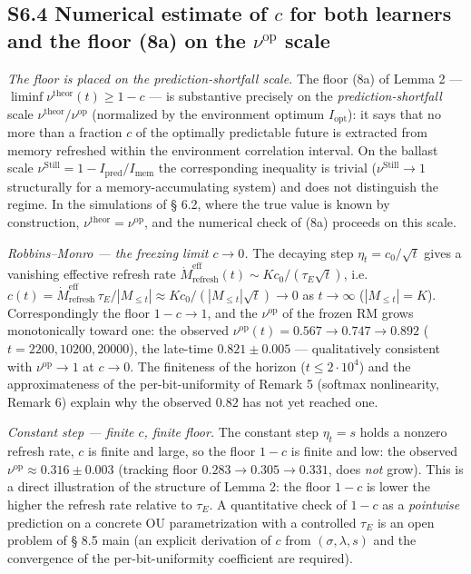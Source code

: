 \documentclass[pdflatex,sn-mathphys-ay]{sn-jnl}
\begin{document}
\subsection*{\texorpdfstring{S6.4 Numerical estimate of \(c\) for both learners and the floor (8a) on the \(\nu^{\text{op}}\) scale}{S6.4 Numerical estimate of c for both learners and the floor (8a) on the \textbackslash nu\^{}\{\textbackslash text\{op\}\} scale}}\label{s6.4-numerical-estimate-of-c-for-both-learners-and-the-floor-8a-on-the-nutextop-scale}



\emph{The floor is placed on the prediction-shortfall scale.} The floor (8a) of Lemma 2 --- \(\liminf \nu^{\text{theor}}(t) \ge 1 - c\) --- is substantive precisely on the \emph{prediction-shortfall} scale \(\nu^{\text{theor}}/\nu^{\text{op}}\) (normalized by the environment optimum \(I_{\text{opt}}\)): it says that no more than a fraction \(c\) of the optimally predictable future is extracted from memory refreshed within the environment correlation interval. On the ballast scale \(\nu^{\text{Still}} = 1 - I_{\text{pred}}/I_{\text{mem}}\) the corresponding inequality is trivial (\(\nu^{\text{Still}} \to 1\) structurally for a memory-accumulating system) and does not distinguish the regime. In the simulations of § 6.2, where the true value is known by construction, \(\nu^{\text{theor}} = \nu^{\text{op}}\), and the numerical check of (8a) proceeds on this scale.



\emph{Robbins--Monro --- the freezing limit \(c \to 0\).} The decaying step \(\eta_t = c_0/\sqrt t\) gives a vanishing effective refresh rate \(\dot M_{\text{refresh}}^{\text{eff}}(t) \sim K c_0/(\tau_E\sqrt t)\), i.e.~\(c(t) = \dot M_{\text{refresh}}^{\text{eff}}\,\tau_E/|M_{\le t}| \approx K c_0/(|M_{\le t}|\sqrt t) \to 0\) as \(t \to \infty\) (\(|M_{\le t}| = K\)). Correspondingly the floor \(1 - c \to 1\), and the \(\nu^{\text{op}}\) of the frozen RM grows monotonically toward one: the observed \(\nu^{\text{op}}(t) = 0.567 \to 0.747 \to 0.892\) (\(t = 2200, 10200, 20000\)), the late-time \(0.821 \pm 0.005\) --- qualitatively consistent with \(\nu^{\text{op}} \to 1\) at \(c \to 0\). The finiteness of the horizon (\(t \le 2\cdot10^4\)) and the approximateness of the per-bit-uniformity of Remark 5 (softmax nonlinearity, Remark 6) explain why the observed \(0.82\) has not yet reached one.



\emph{Constant step --- finite \(c\), finite floor.} The constant step \(\eta_t = s\) holds a nonzero refresh rate, \(c\) is finite and large, so the floor \(1 - c\) is finite and low: the observed \(\nu^{\text{op}} \approx 0.316 \pm 0.003\) (tracking floor \(0.283 \to 0.305 \to 0.331\), does \emph{not} grow). This is a direct illustration of the structure of Lemma 2: the floor \(1 - c\) is lower the higher the refresh rate relative to \(\tau_E\). A quantitative check of \(1-c\) as a \emph{pointwise} prediction on a concrete OU parametrization with a controlled \(\tau_E\) is an open problem of § 8.5 main (an explicit derivation of \(c\) from \((\sigma, \lambda, s)\) and the convergence of the per-bit-uniformity coefficient are required).
\end{document}
